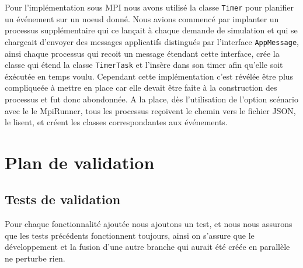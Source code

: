 \documentclass{article}
\begin{document}
				\vspace{5mm}
				Pour l'implémentation sous MPI nous avons utilisé la classe \verb|Timer| pour planifier un événement sur un noeud donné.
				\newline
				Nous avions commencé par implanter un processus supplémentaire qui ce lançait à chaque demande de simulation et qui se chargeait d'envoyer des 
				messages applicatifs distingués par l'interface \verb|AppMessage|, ainsi chaque processus qui recoit un message étendant cette interface, crée la classe 
				qui étend la classe \verb|TimerTask| et l'insère dans son timer afin qu'elle soit éxécutée en temps voulu.
				\newline
				Cependant cette implémentation c'est révélée être plus compliqueée à mettre en place car elle devait être faite à la construction des processus et fut donc abondonnée.
				\newline
				A la place, dès l'utilisation de l'option scénario avec le le MpiRunner, tous les processus reçoivent le chemin vers le fichier JSON, le lisent, et créent les classes correspondantes aux événements. 
		
				
		\newpage
		\section{Plan de validation}
			\subsection{Tests de validation}
			Pour chaque fonctionnalité ajoutée nous ajoutons un test, et nous nous assurons que les tests précédents fonctionnent toujours, ainsi on s'assure que le développement et la fusion d'une autre branche qui aurait été créée en parallèle ne perturbe rien.
			\newline
\end{document}
